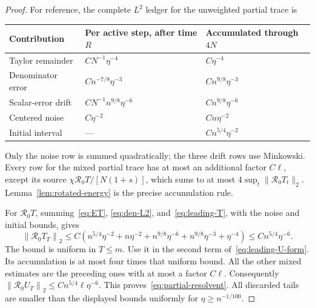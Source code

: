 \documentclass[10pt,a4paper]{amsart}
\newcommand{\R}{\mathcal R}
\newcommand{\norm}[1]{\left\lVert#1\right\rVert}
\begin{document}
\begin{proof}
For reference, the complete $L^2$ ledger for the unweighted partial trace is
\begin{center}
\small
\begin{tabular}{p{}p{}p{}}
\toprule
Contribution & Per active step, after time $R$ & Accumulated through $4N$\\
\midrule
Taylor remainder & $CN^{-1}\eta^{-4}$ & $C\eta^{-4}$\\
Denominator error & $Cn^{-7/8}\eta^{-3}$ & $Cn^{9/8}\eta^{-3}$\\
Scalar-error drift & $CN^{-1}n^{9/8}\eta^{-6}$ & $Cn^{9/8}\eta^{-6}$\\
Centered noise & $C\eta^{-2}$ & $Cn\eta^{-2}$\\
Initial interval & --- & $Cn^{5/4}\eta^{-2}$\\
\bottomrule
\end{tabular}
\end{center}
Only the noise row is summed quadratically; the three drift rows use Minkowski. Every row for the mixed partial trace has at most an additional factor $C\ell$, except its source $\chi\R_0T/[N(1+s)]$, which sums to at most $4\sup_t\|\R_0T_t\|_2$. Lemma~\ref{lem:rotated-energy} is the precise accumulation rule.

For $\R_0T$, summing~\eqref{eq:ET}, \eqref{eq:den-L2}, and~\eqref{eq:leading-T}, with the noise and initial bounds, gives
\[
 \norm{\R_0T_T}_2\le C\left(
 n^{5/4}\eta^{-2}+n\eta^{-2}
 +n^{9/8}\eta^{-6}+n^{9/8}\eta^{-3}+\eta^{-4}\right)
 \le Cn^{5/4}\eta^{-6}.
\]
The bound is uniform in $T\le m$. Use it in the second term of~\eqref{eq:leading-U-form}. Its accumulation is at most four times that uniform bound. All the other mixed estimates are the preceding ones with at most a factor $C\ell$. Consequently
$\norm{\R_0U_T}_2\le Cn^{5/4}\ell\eta^{-6}$.
This proves~\eqref{eq:partial-resolvent}. All discarded tails are smaller than the displayed bounds uniformly for $\eta\ge n^{-1/100}$.
\end{proof}
\end{document}
